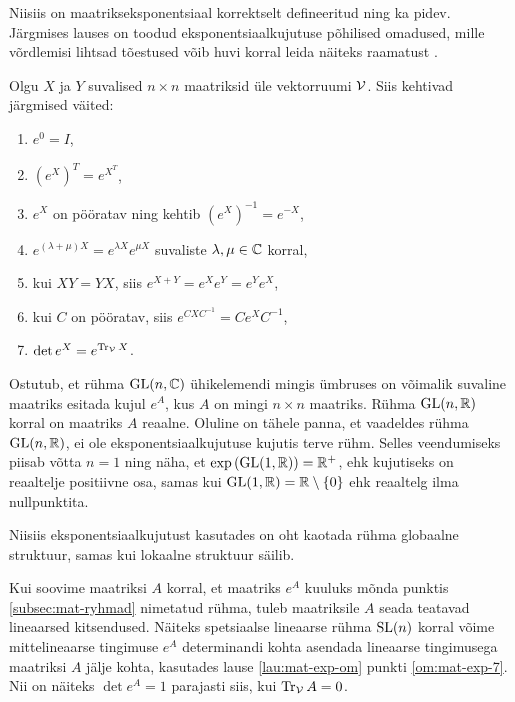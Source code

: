 Niisiis on maatrikseksponentsiaal korrektselt defineeritud ning ka pidev.
Järgmises lauses on toodud eksponentsiaalkujutuse põhilised omadused,
mille võrdlemisi lihtsad tõestused võib huvi korral leida näiteks
raamatust \cite{hall2003lie}.

\begin{lau}\label{lau:mat-exp-om}
    Olgu $X$ ja $Y$ suvalised $n \times n$ maatriksid üle vektorruumi $\mathcal{V}$.
    Siis kehtivad järgmised väited:
    \begin{enumerate}
        \item\label{om:mat-exp-1} $e^0 = I$,
        \item\label{om:mat-exp-2} $\left(e^X\right)^T = e^{X^T}$,
        \item\label{om:mat-exp-3} $e^X$ on pööratav ning kehtib
            $\left(e^X\right)^{-1} = e^{-X}$,
        \item\label{om:mat-exp-4} $e^{(\lambda + \mu)X} =
            e^{\lambda X} e^{\mu X}$ suvaliste $\lambda, \mu \in \mathbb{C}$ korral,
        \item\label{om:mat-exp-5} kui $XY = YX$, siis
            $e^{X+Y} = e^X e^Y = e^Y e^X$,
        \item\label{om:mat-exp-6}  kui $C$ on pööratav, siis
            $e^{CXC^{-1}} = C e^X C^{-1}$,
        \item\label{om:mat-exp-7} $\det e^X = e^{\operatorname{Tr}_{\mathcal{V}} X}$.
    \end{enumerate}
\end{lau}

Ostutub, et rühma $\operatorname{GL}(n, \mathbb{C})$ ühikelemendi mingis ümbruses on võimalik
suvaline maatriks esitada kujul $e^A$, kus $A$ on mingi $n \times n$
maatriks. Rühma $\operatorname{GL}(n, \mathbb{R})$ korral on maatriks $A$ reaalne. Oluline on
tähele panna, et vaadeldes rühma $\operatorname{GL}(n, \mathbb{R})$, ei ole eksponentsiaalkujutuse
kujutis terve rühm. Selles veendumiseks piisab võtta $n = 1$ ning näha, et
$\exp \left(\operatorname{GL}(1, \mathbb{R})\right) = \mathbb{R}^+$, ehk kujutiseks on reaaltelje positiivne
osa, samas kui $\operatorname{GL}(1, \mathbb{R}) = \mathbb{R} \setminus \{0\}$ ehk reaaltelg ilma
nullpunktita.

Niisiis eksponentsiaalkujutust kasutades on oht kaotada rühma globaalne struktuur,
samas kui lokaalne struktuur säilib.

Kui soovime maatriksi $A$ korral, et maatriks $e^A$ kuuluks mõnda punktis
\ref{subsec:mat-ryhmad}  nimetatud rühma, tuleb
maatriksile $A$ seada teatavad lineaarsed kitsendused. Näiteks spetsiaalse
lineaarse rühma $\operatorname{SL}(n)$ korral võime mittelineaarse tingimuse $e^A$
determinandi kohta asendada lineaarse tingimusega maatriksi $A$ jälje kohta,
kasutades lause \ref{lau:mat-exp-om} punkti \ref{om:mat-exp-7}. Nii on näiteks
$\det e^A = 1$ parajasti siis, kui $\operatorname{Tr}_{\mathcal{V}} A = 0$.


